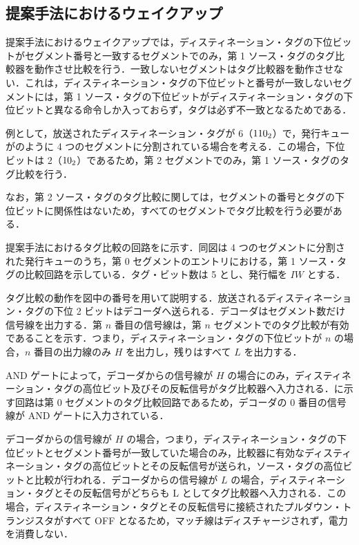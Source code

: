 \subsection{提案手法におけるウェイクアップ}
提案手法におけるウェイクアップでは，ディスティネーション・タグの下位ビットがセグメント番号と一致するセグメントでのみ，第 1 ソース・タグのタグ比較器を動作させ比較を行う．一致しないセグメントはタグ比較器を動作させない．これは，ディスティネーション・タグの下位ビットと番号が一致しないセグメントには，第 1 ソース・タグの下位ビットがディスティネーション・タグの下位ビットと異なる命令しか入っておらず，タグは必ず不一致となるためである．

例として，放送されたディスティネーション・タグが 6（${\rm 110_2}$）で，発行キューがのように 4 つのセグメントに分割されている場合を考える．この場合，下位ビットは 2（${\rm 10_2}$）であるため，第 2 セグメントでのみ，第 1 ソース・タグのタグ比較を行う．

なお，第 2 ソース・タグのタグ比較に関しては，セグメントの番号とタグの下位ビットに関係性はないため，すべてのセグメントでタグ比較を行う必要がある．

提案手法におけるタグ比較の回路をに示す．同図は 4 つのセグメントに分割された発行キューのうち，第 0 セグメントのエントリにおける，第 1 ソース・タグの比較回路を示している．タグ・ビット数は 5 とし、発行幅を $IW$ とする．

タグ比較の動作を図中の番号を用いて説明する．放送されるディスティネーション・タグの下位 2 ビットはデコーダへ送られる．デコーダはセグメント数だけ信号線を出力する．第 $n$ 番目の信号線は，第 $n$ セグメントでのタグ比較が有効であることを示す．つまり，ディスティネーション・タグの下位ビットが $n$ の場合，$n$ 番目の出力線のみ $H$ を出力し，残りはすべて $L$ を出力する．

AND ゲートによって，デコーダからの信号線が $H$ の場合にのみ，ディスティネーション・タグの高位ビット及びその反転信号がタグ比較器へ入力される．に示す回路は第 0 セグメントのタグ比較回路であるため，デコーダの 0 番目の信号線が AND ゲートに入力されている．

デコーダからの信号線が $H$ の場合，つまり，ディスティネーション・タグの下位ビットとセグメント番号が一致していた場合のみ，比較器に有効なディスティネーション・タグの高位ビットとその反転信号が送られ，ソース・タグの高位ビットと比較が行われる．デコーダからの信号線が $L$ の場合，ディスティネーション・タグとその反転信号がどちらも L としてタグ比較器へ入力される．この場合，ディスティネーション・タグとその反転信号に接続されたプルダウン・トランジスタがすべて OFF となるため，マッチ線はディスチャージされず，電力を消費しない．

